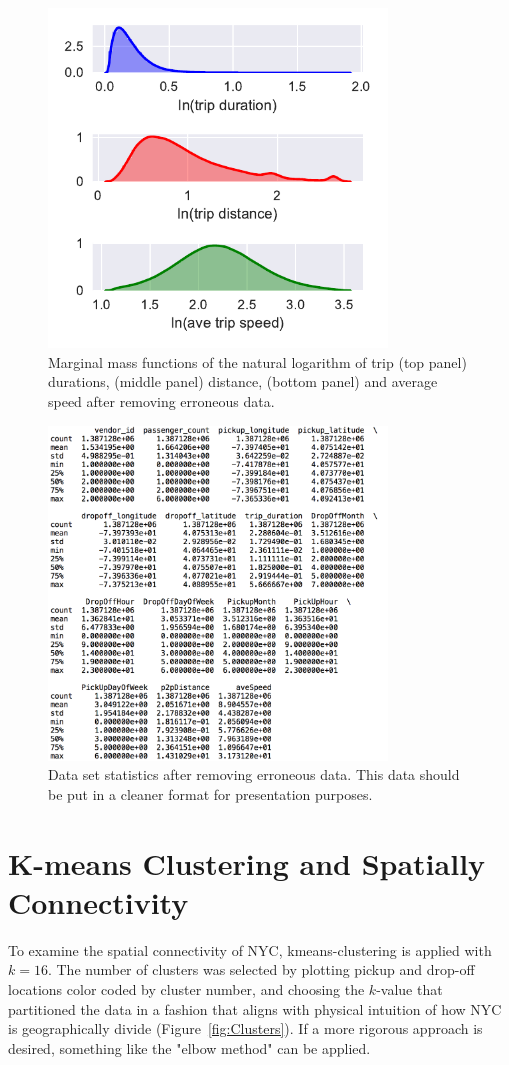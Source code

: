 \documentclass[twocolumn,10pt]{article}
\begin{document}
\begin{figure}
\centering
\includegraphics[width=90mm]{marginalMasFunctions}
\caption{Marginal mass functions of the natural logarithm of trip (top panel) durations, (middle panel) distance, (bottom panel) and average speed after removing erroneous data.}
\label{fig:MarginalMassFunctions}
\end{figure}

\begin{figure}
\centering
\includegraphics[width=90mm]{dataStats}
\caption{Data set statistics after removing erroneous data. This data should be put in a cleaner format for presentation purposes.}
\label{fig:dataStats}
\end{figure}

\section{K-means Clustering and Spatially Connectivity}
To examine the spatial connectivity of NYC, kmeans-clustering is applied with $k=16$. The number of clusters was selected by plotting pickup and drop-off locations color coded by cluster number, and choosing the $k$-value that partitioned the data in a fashion that aligns with physical intuition of how NYC is geographically divide (Figure~\ref{fig:Clusters}). If a more rigorous approach is desired, something like the "elbow method" can be applied.
\end{document}

